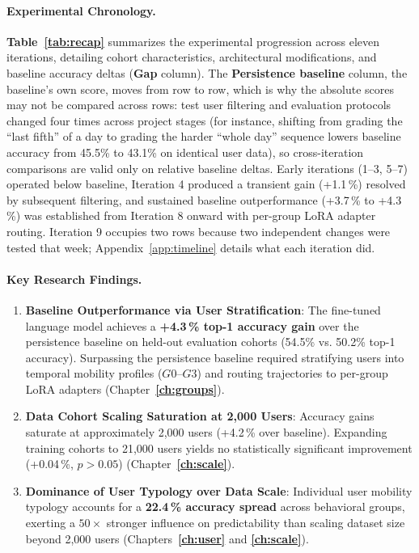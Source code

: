 \paragraph{Experimental Chronology.} \textbf{Table~\ref{tab:recap}} summarizes the experimental progression across eleven iterations, detailing cohort characteristics, architectural modifications, and baseline accuracy deltas (\textbf{Gap} column). The \textbf{Persistence baseline} column, the baseline's own score, moves from row to row, which is why the absolute scores may not be compared across rows: test user filtering and evaluation protocols changed four times across project stages (for instance, shifting from grading the ``last fifth'' of a day to grading the harder ``whole day'' sequence lowers baseline accuracy from 45.5\% to 43.1\% on identical user data), so cross-iteration comparisons are valid only on relative baseline deltas. Early iterations (1--3, 5--7) operated below baseline, Iteration 4 produced a transient gain (+1.1\,\%) resolved by subsequent filtering, and sustained baseline outperformance (+3.7\,\% to +4.3\,\%) was established from Iteration 8 onward with per-group LoRA adapter routing. Iteration 9 occupies two rows because two independent changes were tested that week; Appendix~\ref{app:timeline} details what each iteration did.



\paragraph{Key Research Findings.}
\begin{enumerate}
\item \textbf{Baseline Outperformance via User Stratification}: The fine-tuned language model achieves a \textbf{+4.3\,\% top-1 accuracy gain} over the persistence baseline on held-out evaluation cohorts (54.5\% vs. 50.2\% top-1 accuracy). Surpassing the persistence baseline required stratifying users into temporal mobility profiles ($G0$--$G3$) and routing trajectories to per-group LoRA adapters (Chapter~\textbf{\ref{ch:groups}}).
\item \textbf{Data Cohort Scaling Saturation at 2,000 Users}: Accuracy gains saturate at approximately 2,000 users (+4.2\,\% over baseline). Expanding training cohorts to 21,000 users yields no statistically significant improvement (+0.04\,\%, $p > 0.05$) (Chapter~\textbf{\ref{ch:scale}}).
\item \textbf{Dominance of User Typology over Data Scale}: Individual user mobility typology accounts for a \textbf{22.4\,\% accuracy spread} across behavioral groups, exerting a $50\times$ stronger influence on predictability than scaling dataset size beyond 2,000 users (Chapters~\textbf{\ref{ch:user}} and \textbf{\ref{ch:scale}}).
\end{enumerate}

